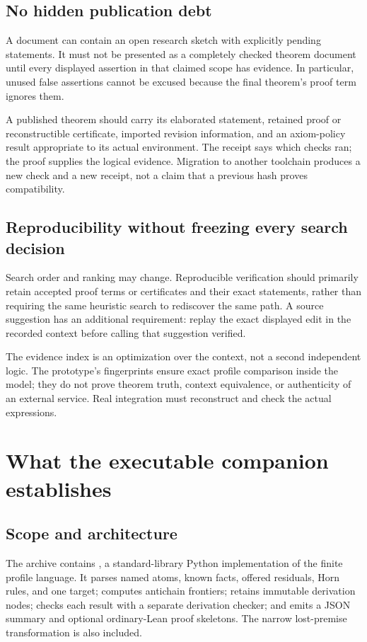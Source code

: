\documentclass[11pt,a4paper]{article}
\newcommand{\code}[1]{\texttt{\detokenize{#1}}}
\theoremstyle{definition}
\theoremstyle{remark}
\begin{document}
\subsection{No hidden publication debt}
A document can contain an open research sketch with explicitly pending statements. It must not be presented as a completely checked theorem document until every displayed assertion in that claimed scope has evidence. In particular, unused false assertions cannot be excused because the final theorem's proof term ignores them.

A published theorem should carry its elaborated statement, retained proof or reconstructible certificate, imported revision information, and an axiom-policy result appropriate to its actual environment. The receipt says which checks ran; the proof supplies the logical evidence. Migration to another toolchain produces a new check and a new receipt, not a claim that a previous hash proves compatibility.

\subsection{Reproducibility without freezing every search decision}
Search order and ranking may change. Reproducible verification should primarily retain accepted proof terms or certificates and their exact statements, rather than requiring the same heuristic search to rediscover the same path. A source suggestion has an additional requirement: replay the exact displayed edit in the recorded context before calling that suggestion verified.

The evidence index is an optimization over the context, not a second independent logic. The prototype's fingerprints ensure exact profile comparison inside the model; they do not prove theorem truth, context equivalence, or authenticity of an external service. Real integration must reconstruct and check the actual expressions.

\section{What the executable companion establishes}\label{sec:experiments}
\subsection{Scope and architecture}
The archive contains \code{prototype/laurel_core.py}, a standard-library Python implementation of the finite profile language. It parses named atoms, known facts, offered residuals, Horn rules, and one target; computes antichain frontiers; retains immutable derivation nodes; checks each result with a separate derivation checker; and emits a JSON summary and optional ordinary-Lean proof skeletons. The narrow lost-premise transformation is also included.
\end{document}
